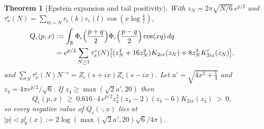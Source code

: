 \documentclass[11pt]{article}
\newtheorem{theorem}{Theorem}[section]
\theoremstyle{definition}\newtheorem{definition}[theorem]{Definition}
\theoremstyle{remark}\newtheorem{remark}[theorem]{Remark}
\newcommand{\R}{\mathbb R}\newcommand{\C}{\mathbb C}\newcommand{\N}{\mathbb N}
\begin{document}
\begin{theorem}[Epstein expansion and tail positivity]\label{thm:epstein}
With $z_N=2\pi\sqrt{N/6}\,e^{p/2}$ and $\tau^\epsilon_x(N)=\sum_{kl=N}r_\epsilon(k)r_\epsilon(l)\cos(x\log\frac kl)$,
\begin{align*}
Q_\epsilon(p,x)&:=\int_\R\Phi_\epsilon\Bigl(\frac{p+q}2\Bigr)\Phi_\epsilon\Bigl(\frac{p-q}2\Bigr)\cos(xq)\,dq\\
&=e^{p/2}\sum_{N\ge1}\tau^\epsilon_x(N)\bigl[(z_N^4+16z_N^2)K_{2ix}(z_N)+8z_N^3K'_{2ix}(z_N)\bigr],
\end{align*}
and $\sum_N\tau^\epsilon_x(N)N^{-s}=Z_\epsilon(s+ix)Z_\epsilon(s-ix)$. Let $a'=\sqrt{4x^2+\frac14}$ and $z_4=4\pi e^{p/2}/\sqrt6$. If $z_4\ge\max(\sqrt2a',20)$ then
\[
Q_\epsilon(p,x)\ \ge\ 0.616\cdot4\,e^{p/2}z_4^2(z_4-2)(z_4-6)K_{2ix}(z_4)\ >\ 0,
\]
so every negative value of $Q_\epsilon(\cdot,x)$ lies at $|p|<p_0^\epsilon(x):=2\log(\max(\sqrt2a',20)\sqrt6/4\pi)$.
\end{theorem}
\end{document}
